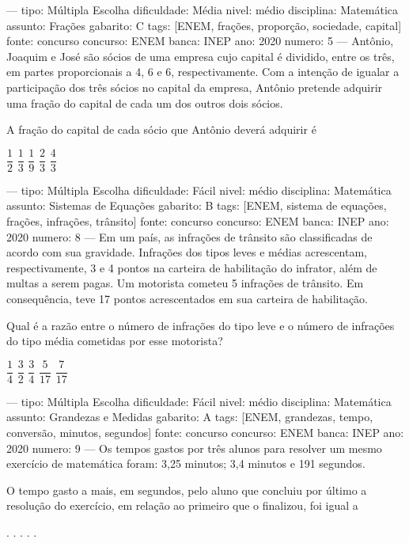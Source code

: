 ---
tipo: Múltipla Escolha
dificuldade: Média
nivel: médio
disciplina: Matemática
assunto: Frações
gabarito: C
tags: [ENEM, frações, proporção, sociedade, capital]
fonte: concurso
concurso: ENEM
banca: INEP
ano: 2020
numero: 5
---
\question
Antônio, Joaquim e José são sócios de uma empresa cujo capital é dividido, entre os três, em partes proporcionais a 4, 6 e 6, respectivamente. Com a intenção de igualar a participação dos três sócios no capital da empresa, Antônio pretende adquirir uma fração do capital de cada um dos outros dois sócios.

A fração do capital de cada sócio que Antônio deverá adquirir é
\begin{choices}
\choice $\dfrac{1}{2}$
\choice $\dfrac{1}{3}$
\CorrectChoice $\dfrac{1}{9}$
\choice $\dfrac{2}{3}$
\choice $\dfrac{4}{3}$
\end{choices}

---
tipo: Múltipla Escolha
dificuldade: Fácil
nivel: médio
disciplina: Matemática
assunto: Sistemas de Equações
gabarito: B
tags: [ENEM, sistema de equações, frações, infrações, trânsito]
fonte: concurso
concurso: ENEM
banca: INEP
ano: 2020
numero: 8
---
\question
Em um país, as infrações de trânsito são classificadas de acordo com sua gravidade. Infrações dos tipos leves e médias acrescentam, respectivamente, 3 e 4 pontos na carteira de habilitação do infrator, além de multas a serem pagas. Um motorista cometeu 5 infrações de trânsito. Em consequência, teve 17 pontos acrescentados em sua carteira de habilitação.

Qual é a razão entre o número de infrações do tipo leve e o número de infrações do tipo média cometidas por esse motorista?
\begin{choices}
\choice $\dfrac{1}{4}$
\CorrectChoice $\dfrac{3}{2}$
\choice $\dfrac{3}{4}$
\choice $\dfrac{5}{17}$
\choice $\dfrac{7}{17}$
\end{choices}

---
tipo: Múltipla Escolha
dificuldade: Fácil
nivel: médio
disciplina: Matemática
assunto: Grandezas e Medidas
gabarito: A
tags: [ENEM, grandezas, tempo, conversão, minutos, segundos]
fonte: concurso
concurso: ENEM
banca: INEP
ano: 2020
numero: 9
---
\question
Os tempos gastos por três alunos para resolver um mesmo exercício de matemática foram: 3,25 minutos; 3,4 minutos e 191 segundos.

O tempo gasto a mais, em segundos, pelo aluno que concluiu por último a resolução do exercício, em relação ao primeiro que o finalizou, foi igual a
\begin{choices}
.
.
.
.
.
\end{choices}

